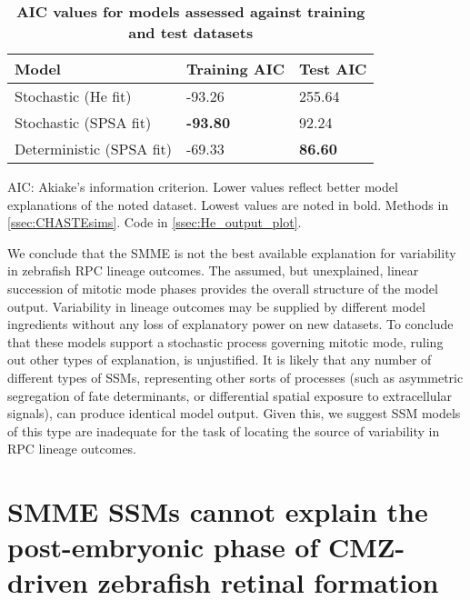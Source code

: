 \begin{table}[!ht]
\centering
\caption{
{\bf AIC values for models assessed against training and test datasets}}
\begin{tabular}{|l|l|l|}
\hline
{\bf Model} & {\bf Training AIC} & {\bf Test AIC} \\ \hline
Stochastic (He fit) & -93.26 & 255.64\\ \hline
Stochastic (SPSA fit) & {\bf -93.80} & 92.24\\ \hline
Deterministic (SPSA fit) & -69.33 & {\bf 86.60}\\ \hline
\end{tabular}
\begin{flushleft} AIC: Akiake's information criterion. Lower values reflect better model explanations of the noted dataset. Lowest values are noted in bold.
Methods in \autoref{ssec:CHASTEsims}.
Code in \autoref{ssec:He_output_plot}.
\end{flushleft}
\label{AICtable}
\end{table}

We conclude that the SMME is not the best available explanation for variability in zebrafish RPC lineage outcomes. The assumed, but unexplained, linear succession of mitotic mode phases provides the overall structure of the model output. Variability in lineage outcomes may be supplied by different model ingredients without any loss of explanatory power on new datasets. To conclude that these models support a stochastic process governing mitotic mode, ruling out other types of explanation, is unjustified. It is likely that any number of different types of SSMs, representing other sorts of processes (such as asymmetric segregation of fate determinants, or differential spatial exposure to extracellular signals), can produce identical model output. Given this, we suggest SSM models of this type are inadequate for the task of locating the source of variability in RPC lineage outcomes.

\section{SMME SSMs cannot explain the post-embryonic phase of CMZ-driven zebrafish retinal formation}

